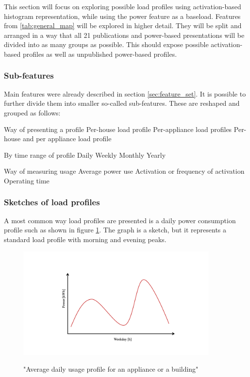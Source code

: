 This section will focus on exploring possible load profiles using activation-based histogram representation,
while using the power feature as a baseload. 
Features from \ref{tab:general_map} will be explored in higher detail. 
They will be split and arranged in a way that all 21 publications and power-based presentations will be divided into as many groups as possible. 
This should expose possible activation-based profiles as well as unpublished power-based profiles.

\subsubsection{Sub-features} \label{sec:subfeatures}

Main features were already described in section \ref{sec:feature_set}.
It is possible to further divide them into smaller so-called sub-features.
These are reshaped and grouped as follows:
\begin{outline}

\1 Way of presenting a profile
\2 Per-house load profile
\2 Per-appliance load profiles
\2 Per-house and per appliance load profile

\1 By time range of profile 
\2 Daily
\2 Weekly
\2 Monthly
\2 Yearly

\1 Way of measuring usage
\2 Average power use 
\2 Activation or frequency of activation
\2 Operating time
\end{outline}

\subsubsection{Sketches of load profiles}
A most common way load profiles are presented is a daily power consumption profile such as shown in figure \ref{fig:daily_power_profile}. 
The graph is a sketch, but it represents a standard load profile with morning and evening peaks.

\begin{figure}[H]
	\centering
	\caption{"Average daily usage profile for an appliance or a building"}
	\includegraphics[width=0.9\textwidth]{Figures/profile_sketches/Slide1.png}
	\label{fig:daily_power_profile}
\end{figure}

